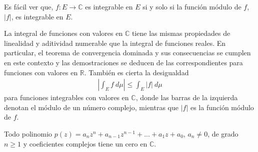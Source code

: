 \begin{obs}
    Es fácil ver que, $f: E \longrightarrow \mathbb{C}$ es integrable en $E$ si y solo si la función módulo de $f$, $|f|$, es integrable en $E$.
\end{obs}
\begin{obs}
    La integral de funciones con valores en $\mathbb{C}$ tiene las mismas propiedades de linealidad y aditividad numerable que la integral de funciones reales. En particular, el teorema de convergencia dominada y sus consecuencias se cumplen en este contexto y las demostraciones se deducen de las correspondientes para funciones con valores en $\mathbb{R}$. También es cierta la desigualdad
    \begin{align*}
        \left| \int_{E}{f \ d\mu} \right| \leq \int_{E}{|f| \ d\mu}
    \end{align*}
    para funciones integrables con valores en $\mathbb{C}$, donde las barras de la izquierda denotan el módulo de un número complejo, mientras que $|f|$ es la función módulo de $f$.
\end{obs}

\begin{teo}
    Todo polinomio $p(z) = a_nz^n + a_{n-1}z^{n-1} + ... + a_1z + a_0$, $a_n \not = 0$, de grado $n \ge 1$ y coeficientes complejos tiene un cero en $\mathbb{C}$.
\end{teo}